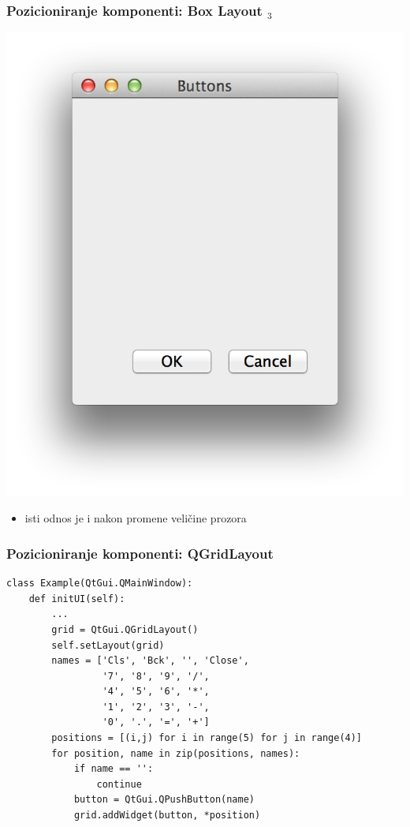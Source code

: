 \documentclass[utf8,compress]{beamer}
\begin{document}
\begin{frame}[fragile]
  \frametitle{Pozicioniranje komponenti: Box Layout $_3$}
\begin{center}
\includegraphics[scale=0.4]{pyqt07.png}
\end{center}
  \begin{itemize}
    \item isti odnos je i nakon promene veličine prozora
  \end{itemize}
\end{frame}

\begin{frame}[fragile,shrink=8]
  \frametitle{Pozicioniranje komponenti: QGridLayout}
\begin{verbatim}
class Example(QtGui.QMainWindow):
    def initUI(self):
        ...
        grid = QtGui.QGridLayout()
        self.setLayout(grid)
        names = ['Cls', 'Bck', '', 'Close',
                 '7', '8', '9', '/',
                 '4', '5', '6', '*',
                 '1', '2', '3', '-',
                 '0', '.', '=', '+']
        positions = [(i,j) for i in range(5) for j in range(4)]
        for position, name in zip(positions, names):
            if name == '':
                continue
            button = QtGui.QPushButton(name)
            grid.addWidget(button, *position)
\end{verbatim}
\end{frame}
\end{document}

